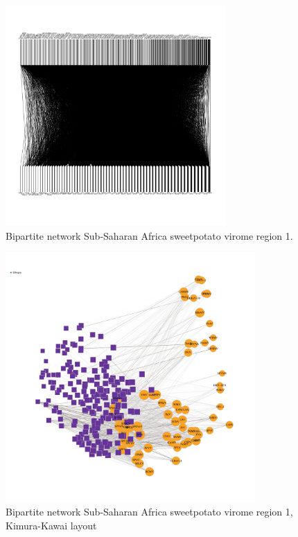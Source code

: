 \documentclass{article}
\begin{document}
\begin{figure}[h!]
\begin{center}
\includegraphics[width=0.75\textwidth]{../results/k-cluster6/6-kcluster_bipartitenetwork_Feb28.pdf
} %
\caption{Bipartite network Sub-Saharan Africa sweetpotato virome region 1.}
\end{center}
\end{figure}



\begin{figure}[h!]
\begin{center}
\includegraphics[width=0.85\textwidth]{../results/k-cluster6/6-kcluster_bipartitenetwork-kk_Feb28.pdf
} %
\caption{Bipartite network Sub-Saharan Africa sweetpotato virome region 1, Kimura-Kawai layout}
\end{center}
\end{figure}
\end{document}
